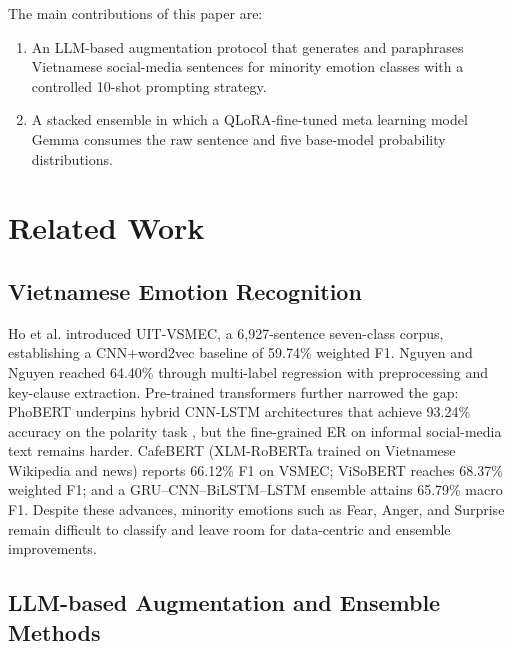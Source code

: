 \documentclass[conference]{IEEEtran}
\begin{document}
The main contributions of this paper are:
\begin{enumerate}
  \item An LLM-based augmentation protocol that generates and paraphrases Vietnamese
        social-media sentences for minority emotion classes with a controlled
        10-shot prompting strategy.
  \item A stacked ensemble in which a QLoRA-fine-tuned meta learning model Gemma consumes the raw sentence and five base-model probability distributions.
\end{enumerate}

\section{Related Work}

\subsection{Vietnamese Emotion Recognition}

Ho et al.\cite{ho2020emotion} introduced UIT-VSMEC, a 6,927-sentence seven-class
corpus, establishing a CNN+word2vec baseline of 59.74\% weighted F1. Nguyen and
Nguyen \cite{nguyen2020exploiting} reached 64.40\% through multi-label regression with preprocessing and key-clause extraction. Pre-trained transformers further narrowed the gap: PhoBERT \cite{nguyen2020phobert} underpins hybrid CNN-LSTM architectures that achieve 93.24\% accuracy on the polarity task \cite{nguyen2025phobert}, but the fine-grained ER on informal social-media text remains harder. CafeBERT \cite{do2024vlue} (XLM-RoBERTa trained on Vietnamese Wikipedia and news) reports 66.12\% F1 on VSMEC; ViSoBERT \cite{nguyen2024visobert} reaches 68.37\% weighted F1; and a GRU--CNN--BiLSTM--LSTM ensemble \cite{huynh2020ensemble} attains 65.79\% macro F1. Despite these advances, minority emotions such as Fear,
Anger, and Surprise remain difficult to classify and leave room for data-centric and
ensemble improvements.

\subsection{LLM-based Augmentation and Ensemble Methods}
\end{document}
